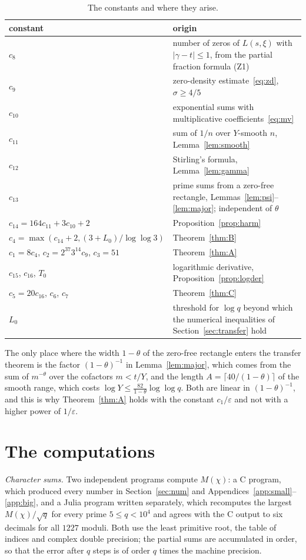 \documentclass[11pt,a4paper,reqno]{amsart}
\theoremstyle{remark}
\numberwithin{equation}{section}
\newcommand{\eps}{\varepsilon}
\begin{document}
\begin{table}[ht]
\centering\small
\renewcommand{\arraystretch}{1.15}
\begin{tabular}{@{}lp{}@{}}
\toprule
constant & origin\\
\midrule
$c_8$ & number of zeros of $L(s,\xi)$ with $|\gamma-t|\le1$, from the partial fraction formula (Z1)\\
$c_9$ & zero-density estimate~\eqref{eq:zd}, $\sigma\ge4/5$\\
$c_{10}$ & exponential sums with multiplicative coefficients~\eqref{eq:mv}\\
$c_{11}$ & sum of $1/n$ over $Y$-smooth $n$, Lemma~\ref{lem:smooth}\\
$c_{12}$ & Stirling's formula, Lemma~\ref{lem:gamma}\\
$c_{13}$ & prime sums from a zero-free rectangle, Lemmas~\ref{lem:psi}--\ref{lem:major}; independent of $\theta$\\
$c_{14}=164c_{11}+3c_{10}+2$ & Proposition~\ref{prop:harm}\\
$c_4=\max(c_{14}+2,(3+L_0)/\log\log3)$ & Theorem~\ref{thm:B}\\
$c_1=8c_4$, $c_2=2^{37}3^{14}c_9$, $c_3=51$ & Theorem~\ref{thm:A}\\
$c_{15}$, $c_{16}$, $T_0$ & logarithmic derivative, Proposition~\ref{prop:logder}\\
$c_5=20c_{16}$, $c_6$, $c_7$ & Theorem~\ref{thm:C}\\
$L_0$ & threshold for $\log q$ beyond which the numerical inequalities of Section~\ref{sec:transfer} hold\\
\bottomrule
\end{tabular}
\caption{The constants and where they arise.}
\label{tab:const}
\end{table}

The only place where the width $1-\theta$ of the zero-free rectangle enters the transfer theorem is the factor $(1-\theta)^{-1}$ in Lemma~\ref{lem:major}, which comes from the sum of $m^{-\theta}$ over the cofactors $m<t/Y$, and the length $A=\lceil40/(1-\theta)\rceil$ of the smooth range, which costs $\log Y\le\frac{82}{1-\theta}\log\log q$. Both are linear in $(1-\theta)^{-1}$, and this is why Theorem~\ref{thm:A} holds with the constant $c_1/\eps$ and not with a higher power of $1/\eps$.

\section{The computations}\label{app:comp}
\emph{Character sums.} Two independent programs compute $M(\chi)$: a C program, which produced every number in Section~\ref{sec:num} and Appendices~\ref{app:small}--\ref{app:big}, and a Julia program written separately, which recomputes the largest $M(\chi)/\sqrt q$ for every prime $5\le q<10^4$ and agrees with the C output to six decimals for all $1227$ moduli. Both use the least primitive root, the table of indices and complex double precision; the partial sums are accumulated in order, so that the error after $q$ steps is of order $q$ times the machine precision.
\end{document}
